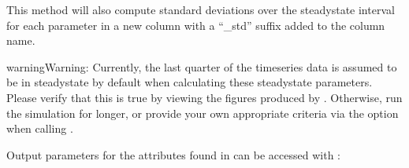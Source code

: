 \documentclass[letterpaper,10pt,english,openany,oneside]{sphinxmanual}
\begin{document}
\begin{sphinxVerbatim}[commandchars=\\\{\}]
  
\end{sphinxVerbatim}

\sphinxAtStartPar
This method will also compute standard deviations over the
steady\sphinxhyphen{}state interval for each parameter in a new column
with a “\_std” suffix added to the column name.

\begin{sphinxadmonition}{warning}{Warning:}
\sphinxAtStartPar
Currently, the last quarter of the timeseries data is assumed to be
in steady\sphinxhyphen{}state by default when calculating these steady\sphinxhyphen{}state parameters.
Please verify that this is true by viewing the figures produced by
. Otherwise, run the simulation for longer,
or provide your own appropriate criteria via the  option when
calling {\hyperref[\detokenize{api/pytb.ThunderBoltz.get_ss_params:pytb.ThunderBoltz.get_ss_params}]{}}.
\end{sphinxadmonition}

\sphinxAtStartPar
Output parameters for the attributes found in
{\hyperref[\detokenize{api/pytb.parameters.ParticleParameters:pytb.parameters.ParticleParameters}]{}} can be accessed with
{\hyperref[\detokenize{api/pytb.ThunderBoltz.get_particle_tables:pytb.ThunderBoltz.get_particle_tables}]{}}:

\begin{sphinxVerbatim}[commandchars=\\\{\}]
  

 
\end{sphinxVerbatim}
\end{document}
